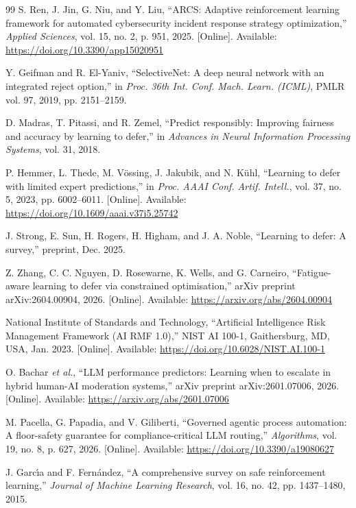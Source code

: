 \documentclass[12pt,a4paper]{article}
\begin{document}
\begin{thebibliography}{99}
 S. Ren, J. Jin, G. Niu, and Y. Liu, ``ARCS: Adaptive reinforcement learning framework for automated cybersecurity incident response strategy optimization,'' \emph{Applied Sciences}, vol. 15, no. 2, p. 951, 2025. [Online]. Available: \url{https://doi.org/10.3390/app15020951}

 Y. Geifman and R. El-Yaniv, ``SelectiveNet: A deep neural network with an integrated reject option,'' in \emph{Proc. 36th Int. Conf. Mach. Learn. (ICML)}, PMLR vol. 97, 2019, pp. 2151--2159.

 D. Madras, T. Pitassi, and R. Zemel, ``Predict responsibly: Improving fairness and accuracy by learning to defer,'' in \emph{Advances in Neural Information Processing Systems}, vol. 31, 2018.

 P. Hemmer, L. Thede, M. V\"{o}ssing, J. Jakubik, and N. K\"{u}hl, ``Learning to defer with limited expert predictions,'' in \emph{Proc. AAAI Conf. Artif. Intell.}, vol. 37, no. 5, 2023, pp. 6002--6011. [Online]. Available: \url{https://doi.org/10.1609/aaai.v37i5.25742}

 J. Strong, E. Sun, H. Rogers, H. Higham, and J. A. Noble, ``Learning to defer: A survey,'' preprint, Dec. 2025.

 Z. Zhang, C. C. Nguyen, D. Rosewarne, K. Wells, and G. Carneiro, ``Fatigue-aware learning to defer via constrained optimisation,'' arXiv preprint arXiv:2604.00904, 2026. [Online]. Available: \url{https://arxiv.org/abs/2604.00904}

 National Institute of Standards and Technology, ``Artificial Intelligence Risk Management Framework (AI RMF 1.0),'' NIST AI 100-1, Gaithersburg, MD, USA, Jan. 2023. [Online]. Available: \url{https://doi.org/10.6028/NIST.AI.100-1}

 O. Bachar \emph{et al.}, ``LLM performance predictors: Learning when to escalate in hybrid human-AI moderation systems,'' arXiv preprint arXiv:2601.07006, 2026. [Online]. Available: \url{https://arxiv.org/abs/2601.07006}

 M. Pacella, G. Papadia, and V. Giliberti, ``Governed agentic process automation: A floor-safety guarantee for compliance-critical LLM routing,'' \emph{Algorithms}, vol. 19, no. 8, p. 627, 2026. [Online]. Available: \url{https://doi.org/10.3390/a19080627}

 J. Garc\'{\i}a and F. Fern\'{a}ndez, ``A comprehensive survey on safe reinforcement learning,'' \emph{Journal of Machine Learning Research}, vol. 16, no. 42, pp. 1437--1480, 2015.


\end{thebibliography}
\end{document}
